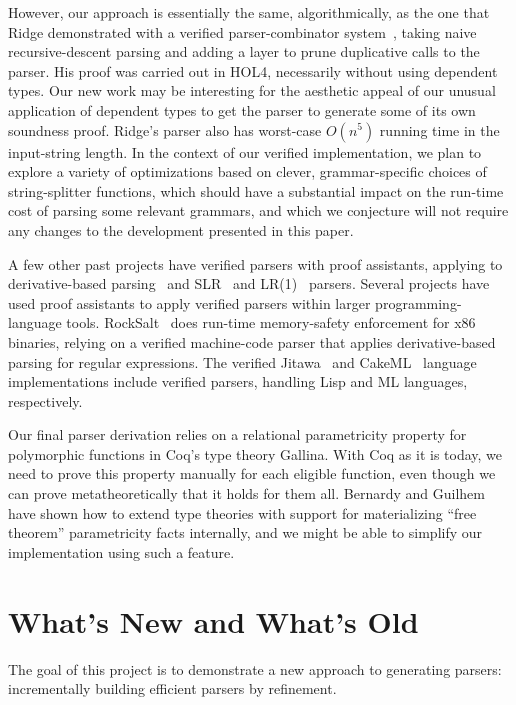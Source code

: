   However, our approach is essentially the same, algorithmically, as the one that Ridge demonstrated with a verified parser-combinator system~\cite{Ridge}, taking naive recursive-descent parsing and adding a layer to prune duplicative calls to the parser.  His proof was carried out in HOL4, necessarily without using dependent types.  Our new work may be interesting for the aesthetic appeal of our unusual application of dependent types to get the parser to generate some of its own soundness proof.  Ridge's parser also has worst-case $O(n^5)$ running time in the input-string length.  In the context of our verified implementation, we plan to explore a variety of optimizations based on clever, grammar-specific choices of string-splitter functions, which should have a substantial impact on the run-time cost of parsing some relevant grammars, and which we conjecture will not require any changes to the development presented in this paper.

  A few other past projects have verified parsers with proof assistants, applying to derivative-based parsing~\cite{DerivsCoq} and SLR~\cite{SLR} and LR(1)~\cite{LR1} parsers.  Several projects have used proof assistants to apply verified parsers within larger programming-language tools.  RockSalt~\cite{RockSalt} does run-time memory-safety enforcement for x86 binaries, relying on a verified machine-code parser that applies derivative-based parsing for regular expressions.  The verified Jitawa~\cite{Jitawa} and CakeML~\cite{CakeML} language implementations include verified parsers, handling Lisp and ML languages, respectively.

  Our final parser derivation relies on a relational parametricity property for polymorphic functions in Coq's type theory Gallina.  With Coq as it is today, we need to prove this property manually for each eligible function, even though we can prove metatheoretically that it holds for them all.  Bernardy and Guilhem~\cite{InColor} have shown how to extend type theories with support for materializing ``free theorem'' parametricity facts internally, and we might be able to simplify our implementation using such a feature.

\section{What's New and What's Old} \label{sec:new} \label{sec:goals}
  The goal of this project is to demonstrate a new approach to generating parsers: incrementally building efficient parsers by refinement.
  
